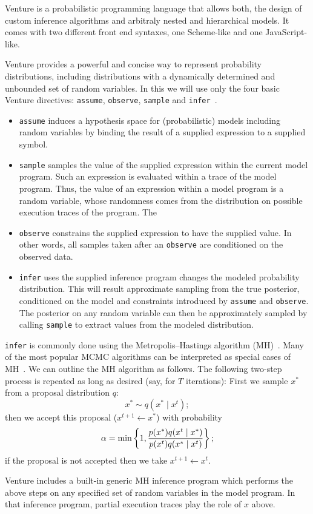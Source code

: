 Venture is a probabilistic programming language that allows both, the design of custom inference algorithms and arbitraly nested and hierarchical models. It comes with two different front end syntaxes, one Scheme-like and  one JavaScript-like.

Venture provides a powerful and concise way to represent probability distributions, including distributions with a dynamically determined and unbounded set of random variables.
In this \paperOrChapter we will use only the four basic Venture directives: \texttt{assume}, \texttt{observe}, \texttt{sample} and \texttt{infer}~\citep{mansinghka2014venture}.
\begin{itemize}
  \item \texttt{assume} induces a hypothesis space for (probabilistic) models including random variables by binding the result of a supplied expression to a supplied symbol.
  \item \texttt{sample} samples the value of the supplied expression within the current model program. Such an expression is evaluated within a trace of the model program.
    Thus, the value of an expression within a model program is a random variable, whose randomness comes from the distribution on possible execution traces of the program.
    The 
  \item \texttt{observe} constrains the supplied expression to have the supplied value.
    In other words, all samples taken after an \texttt{observe} are conditioned on the observed data.
  \item \texttt{infer} uses the supplied inference program changes the modeled probability distribution.
    This will result approximate sampling from the true posterior, conditioned on the model and constraints introduced by \texttt{assume} and \texttt{observe}.
    The posterior on any random variable can then be approximately sampled by calling \texttt{sample} to extract values from the modeled distribution.
\end{itemize}

\texttt{infer} is commonly done using the Metropolis--Hastings algorithm (MH)~\citep{metropolis1953equation}.
Many of the most popular MCMC algorithms can be interpreted as special cases of MH~\citep{andrieu2003introduction}.
We can outline the MH algorithm as follows.
The following two-step process is repeated as long as desired (say, for $T$ iterations):
First we sample $x^*$ from a proposal distribution $q$:
\begin{equation}
 x^* \sim q(x^* \mid x^{t});
\end{equation}
then we accept this proposal ($x^{t+1} \leftarrow x ^*$) with probability
\begin{equation}
  \alpha = \min \left\{ 
    1,
    \frac{p(x^*) q(x^{t}\mid x^*)}{p(x^{t}) q(x^* \mid x^{t})} \right\};
\end{equation}
if the proposal is not accepted then we take $x^{t+1} \gets x^t$.

Venture includes a built-in generic MH inference program which performs the above steps on any specified set of random variables in the model program.
In that inference program, partial execution traces play the role of $x$ above.



